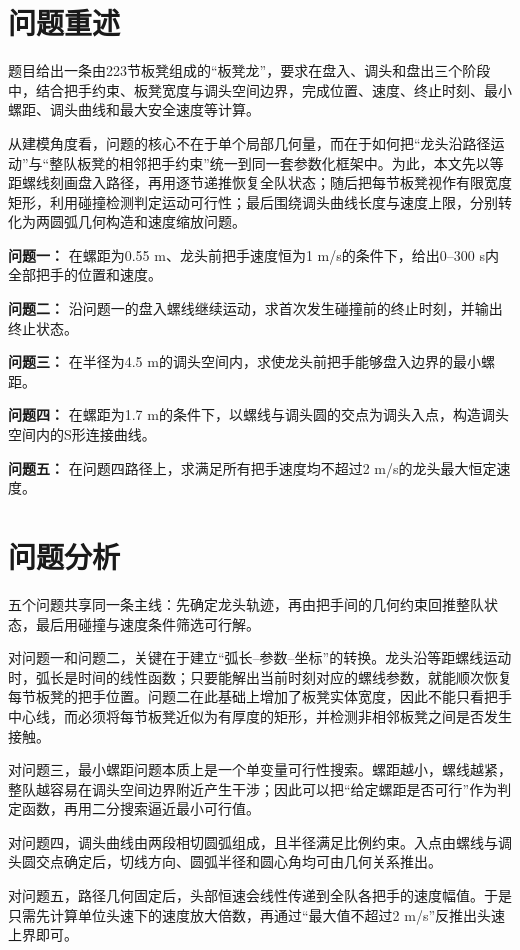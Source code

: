 \section{问题重述}
题目给出一条由223节板凳组成的“板凳龙”，要求在盘入、调头和盘出三个阶段中，结合把手约束、板凳宽度与调头空间边界，完成位置、速度、终止时刻、最小螺距、调头曲线和最大安全速度等计算。

从建模角度看，问题的核心不在于单个局部几何量，而在于如何把“龙头沿路径运动”与“整队板凳的相邻把手约束”统一到同一套参数化框架中。为此，本文先以等距螺线刻画盘入路径，再用逐节递推恢复全队状态；随后把每节板凳视作有限宽度矩形，利用碰撞检测判定运动可行性；最后围绕调头曲线长度与速度上限，分别转化为两圆弧几何构造和速度缩放问题。

\textbf{问题一：} 在螺距为0.55 m、龙头前把手速度恒为1 m/s的条件下，给出0--300 s内全部把手的位置和速度。

\textbf{问题二：} 沿问题一的盘入螺线继续运动，求首次发生碰撞前的终止时刻，并输出终止状态。

\textbf{问题三：} 在半径为4.5 m的调头空间内，求使龙头前把手能够盘入边界的最小螺距。

\textbf{问题四：} 在螺距为1.7 m的条件下，以螺线与调头圆的交点为调头入点，构造调头空间内的S形连接曲线。

\textbf{问题五：} 在问题四路径上，求满足所有把手速度均不超过2 m/s的龙头最大恒定速度。

\section{问题分析}
五个问题共享同一条主线：先确定龙头轨迹，再由把手间的几何约束回推整队状态，最后用碰撞与速度条件筛选可行解。

对问题一和问题二，关键在于建立“弧长--参数--坐标”的转换。龙头沿等距螺线运动时，弧长是时间的线性函数；只要能解出当前时刻对应的螺线参数，就能顺次恢复每节板凳的把手位置。问题二在此基础上增加了板凳实体宽度，因此不能只看把手中心线，而必须将每节板凳近似为有厚度的矩形，并检测非相邻板凳之间是否发生接触。

对问题三，最小螺距问题本质上是一个单变量可行性搜索。螺距越小，螺线越紧，整队越容易在调头空间边界附近产生干涉；因此可以把“给定螺距是否可行”作为判定函数，再用二分搜索逼近最小可行值。

对问题四，调头曲线由两段相切圆弧组成，且半径满足比例约束。入点由螺线与调头圆交点确定后，切线方向、圆弧半径和圆心角均可由几何关系推出。

对问题五，路径几何固定后，头部恒速会线性传递到全队各把手的速度幅值。于是只需先计算单位头速下的速度放大倍数，再通过“最大值不超过2 m/s”反推出头速上界即可。
